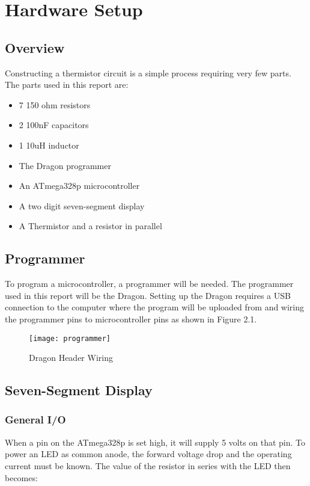 \documentclass[main.tex]{subfiles}
\begin{document}
\chapter{Hardware Setup}
	\section{Overview}
	Constructing a thermistor circuit is a simple process requiring very few parts. The parts
	used in this report are:
	\begin{itemize}
		\item 7 150 ohm resistors
		\item 2 100nF capacitors
		\item 1 10uH inductor
		\item The Dragon programmer
		\item An ATmega328p microcontroller
		\item A two digit seven-segment display
		\item A Thermistor and a resistor in parallel
	\end{itemize}
	
	
	\section{Programmer}
	To program a microcontroller, a programmer will be needed. The programmer used in this report
	will be the Dragon. Setting up the Dragon requires a USB connection to the computer where
	the program will be uploaded from and wiring the programmer pins to microcontroller pins
	as shown in Figure 2.1.
	\begin{figure}[H]
		\begin{center}
			\texttt{[image: programmer]}
		\end{center}
		\caption{Dragon Header Wiring}
		\label{fig:prog}
	\end{figure}	


	\section{Seven-Segment Display}
		\subsection{General I/O}
		When a pin on the ATmega328p is set high, it will supply 5 volts on that pin. To power an
		LED as common anode, the forward voltage drop and the operating current must be known.
		The value of the resistor in series with the LED then becomes: 
		
\end{document}
